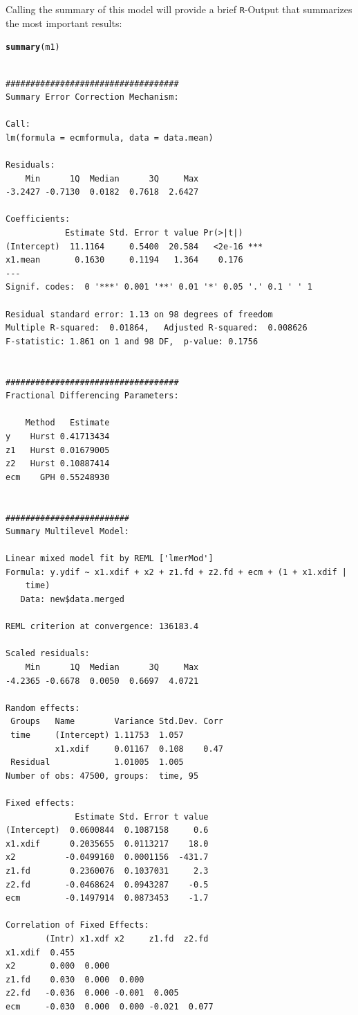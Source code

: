 \documentclass[12pt]{paper}\usepackage[]{graphicx}\usepackage[]{color}
\makeatletter
\newcommand{\hlstd}[1]{\textcolor[rgb]{0.345,0.345,0.345}{#1}}%
\newcommand{\hlkwd}[1]{\textcolor[rgb]{0.737,0.353,0.396}{\textbf{#1}}}%
\newenvironment{kframe}{%
 \def\at@end@of@kframe{}%
 \ifinner\ifhmode%
  \def\at@end@of@kframe{\end{minipage}}%
  \begin{minipage}{\columnwidth}%
 \fi\fi%
 \def\FrameCommand##1{\hskip\@totalleftmargin \hskip-\fboxsep
 \colorbox{shadecolor}{##1}\hskip-\fboxsep
     \hskip-\linewidth \hskip-\@totalleftmargin \hskip\columnwidth}%
 \MakeFramed {\advance\hsize-\width
   \@totalleftmargin\z@ \linewidth\hsize
   \@setminipage}}%
 {\par\unskip\endMakeFramed%
 \at@end@of@kframe}
\newenvironment{knitrout}{}{} %
\makeatother
\begin{document}
Calling the summary of this model will provide a brief \texttt{R}-Output that summarizes the most important results:

\begin{knitrout}
\color{fgcolor}\begin{kframe}
\begin{alltt}
\hlkwd{summary}\hlstd{(m1)}
\end{alltt}
\begin{verbatim}

###################################
Summary Error Correction Mechanism: 

Call:
lm(formula = ecmformula, data = data.mean)

Residuals:
    Min      1Q  Median      3Q     Max 
-3.2427 -0.7130  0.0182  0.7618  2.6427 

Coefficients:
            Estimate Std. Error t value Pr(>|t|)    
(Intercept)  11.1164     0.5400  20.584   <2e-16 ***
x1.mean       0.1630     0.1194   1.364    0.176    
---
Signif. codes:  0 '***' 0.001 '**' 0.01 '*' 0.05 '.' 0.1 ' ' 1

Residual standard error: 1.13 on 98 degrees of freedom
Multiple R-squared:  0.01864,	Adjusted R-squared:  0.008626 
F-statistic: 1.861 on 1 and 98 DF,  p-value: 0.1756


###################################
Fractional Differencing Parameters: 

    Method   Estimate
y    Hurst 0.41713434
z1   Hurst 0.01679005
z2   Hurst 0.10887414
ecm    GPH 0.55248930


#########################
Summary Multilevel Model: 

Linear mixed model fit by REML ['lmerMod']
Formula: y.ydif ~ x1.xdif + x2 + z1.fd + z2.fd + ecm + (1 + x1.xdif |  
    time)
   Data: new$data.merged

REML criterion at convergence: 136183.4

Scaled residuals: 
    Min      1Q  Median      3Q     Max 
-4.2365 -0.6678  0.0050  0.6697  4.0721 

Random effects:
 Groups   Name        Variance Std.Dev. Corr
 time     (Intercept) 1.11753  1.057        
          x1.xdif     0.01167  0.108    0.47
 Residual             1.01005  1.005        
Number of obs: 47500, groups:  time, 95

Fixed effects:
              Estimate Std. Error t value
(Intercept)  0.0600844  0.1087158     0.6
x1.xdif      0.2035655  0.0113217    18.0
x2          -0.0499160  0.0001156  -431.7
z1.fd        0.2360076  0.1037031     2.3
z2.fd       -0.0468624  0.0943287    -0.5
ecm         -0.1497914  0.0873453    -1.7

Correlation of Fixed Effects:
        (Intr) x1.xdf x2     z1.fd  z2.fd 
x1.xdif  0.455                            
x2       0.000  0.000                     
z1.fd    0.030  0.000  0.000              
z2.fd   -0.036  0.000 -0.001  0.005       
ecm     -0.030  0.000  0.000 -0.021  0.077
\end{verbatim}
\end{kframe}
\end{knitrout}
\end{document}
